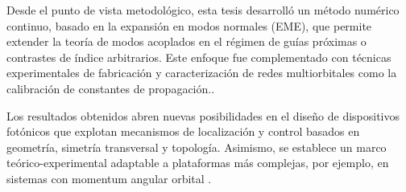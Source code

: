 Desde el punto de vista metodológico, esta tesis desarrolló un método numérico continuo, basado en la expansión en modos normales (EME), que permite extender la teoría de modos acoplados en el régimen de guías próximas o contrastes de índice arbitrarios. Este enfoque fue complementado con técnicas experimentales de fabricación y caracterización de redes multiorbitales como la calibración de constantes de propagación..

Los resultados obtenidos abren nuevas posibilidades en el diseño de dispositivos fotónicos que explotan mecanismos de localización y control basados en geometría, simetría transversal y topología. Asimismo, se establece un marco teórico-experimental adaptable a plataformas más complejas, por ejemplo, en sistemas con momentum angular orbital \citep{OAMCaging}.

